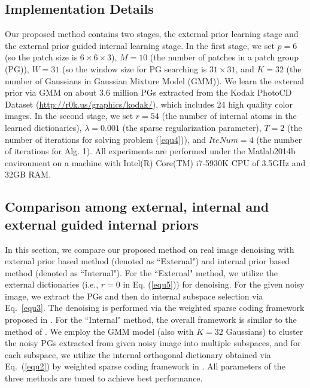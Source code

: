 \documentclass[10pt,twocolumn,letterpaper]{article}
\begin{document}
\subsection{Implementation Details}
Our proposed method contains two stages, the external prior learning stage and the external prior guided internal learning stage. In the first stage, we set $p = 6$ (so the patch size is $6\times 6 \times 3$), $M=10$ (the number of patches in a patch group (PG)), $W=31$ (so the window size for PG searching is $31\times31$, and $K=32$ (the number of Gaussians in Gaussian Mixture Model (GMM)). We learn the external prior via GMM on about 3.6 million PGs extracted from the Kodak PhotoCD Dataset (\url{http://r0k.us/graphics/kodak/}), which includes 24 high quality color images. In the second stage, we set $r=54$ (the number of internal atoms in the learned dictionaries), $\lambda=0.001$ (the sparse regularization parameter), $T=2$ (the number of iterations for solving problem (\ref{equ4})), and $IteNum=4$ (the number of iterations for Alg. 1). All experiments are performed under the Matlab2014b environment on a machine with Intel(R) Core(TM) i7-5930K CPU of 3.5GHz and 32GB RAM.

\subsection{Comparison among external, internal and external guided internal priors}
In this section, we compare our proposed method on real image denoising with external prior based method (denoted as ``External") and internal prior based method (denoted as ``Internal"). For the ``External" method, we utilize the external dictionaries (i.e., $r=0$ in Eq. (\ref{equ5})) for denoising. For the given noisy image, we extract the PGs and then do internal subspace selection via Eq.\ \ref{equ3}. The denoising is performed via the weighted sparse coding framework proposed in \cite{pgpd}. For the ``Internal" method, the overall framework is similar to the method of \cite{ncsr}. We employ the GMM model (also with $K=32$ Gaussians) to cluster the noisy PGs extracted from given noisy image into multiple subspaces, and for each subspace, we utilize the internal orthogonal dictionary obtained via Eq.\ (\ref{equ2}) by weighted sparse coding framework in \cite{pgpd}. All parameters of the three methods are tuned to achieve best performance.
\end{document}
